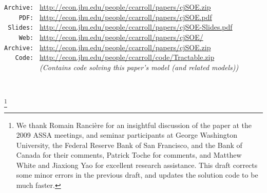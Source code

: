 \documentclass[titlepage,abstract,letterpaper]{econtex}
\begin{document}
\begin{small}
\parbox{\textwidth}{
\begin{center}
\begin{tabbing}
\texttt{Archive:~} \= \= \url{http://econ.jhu.edu/people/ccarroll/papers/cjSOE.zip} \kill \\  %
\texttt{~~~~PDF:~}\> \> \url{http://econ.jhu.edu/people/ccarroll/papers/cjSOE.pdf} \\
\texttt{~Slides:~}\> \> \url{http://econ.jhu.edu/people/ccarroll/papers/cjSOE-Slides.pdf} \\
\texttt{~~~~Web:~} \> \> \url{http://econ.jhu.edu/people/ccarroll/papers/cjSOE/}    \\
\texttt{Archive:~} \> \> \url{http://econ.jhu.edu/people/ccarroll/papers/cjSOE.zip} \\
\texttt{~~~Code:~} \> \> \url{http://econ.jhu.edu/people/ccarroll/code/Tractable.zip} \\
\texttt{~~~~~~~~~} \> \> {\it (Contains code solving this paper's model (and related models))}
\end{tabbing}
\end{center}
}
\end{small}

\begin{authorsinfo}
\\
\end{authorsinfo}

\thanks{We thank Romain Ranci\`ere for an insightful discussion of the
  paper at the 2009 ASSA meetings, and seminar participants at George
  Washington University, the Federal Reserve Bank of San Francisco,
  and the Bank of Canada for their comments, Patrick Toche for
  comments, and Matthew White and Jiaxiong Yao for excellent research assistance.  This draft corrects some minor errors in the previous draft, and updates the solution code to be much faster.}

\titlepagefinish
\setcounter{page}{1}
\end{document}
